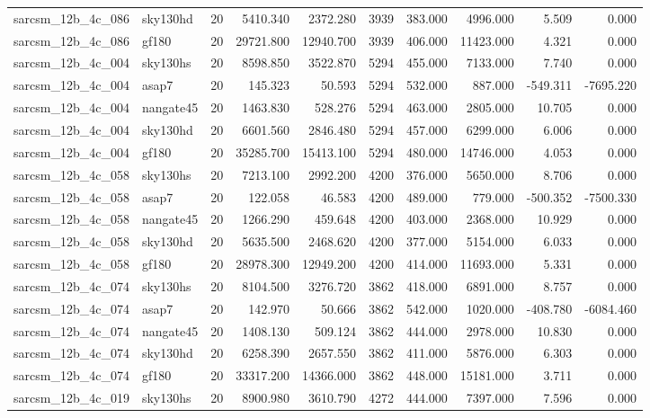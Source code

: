 \begin{longtable}{llrrrrrrrr}
sarcsm\_12b\_4c\_086 & sky130hd & 20 & 5410.340 & 2372.280 & 3939 & 383.000 & 4996.000 & 5.509 & 0.000 \\
sarcsm\_12b\_4c\_086 & gf180 & 20 & 29721.800 & 12940.700 & 3939 & 406.000 & 11423.000 & 4.321 & 0.000 \\
sarcsm\_12b\_4c\_004 & sky130hs & 20 & 8598.850 & 3522.870 & 5294 & 455.000 & 7133.000 & 7.740 & 0.000 \\
sarcsm\_12b\_4c\_004 & asap7 & 20 & 145.323 & 50.593 & 5294 & 532.000 & 887.000 & -549.311 & -7695.220 \\
sarcsm\_12b\_4c\_004 & nangate45 & 20 & 1463.830 & 528.276 & 5294 & 463.000 & 2805.000 & 10.705 & 0.000 \\
sarcsm\_12b\_4c\_004 & sky130hd & 20 & 6601.560 & 2846.480 & 5294 & 457.000 & 6299.000 & 6.006 & 0.000 \\
sarcsm\_12b\_4c\_004 & gf180 & 20 & 35285.700 & 15413.100 & 5294 & 480.000 & 14746.000 & 4.053 & 0.000 \\
sarcsm\_12b\_4c\_058 & sky130hs & 20 & 7213.100 & 2992.200 & 4200 & 376.000 & 5650.000 & 8.706 & 0.000 \\
sarcsm\_12b\_4c\_058 & asap7 & 20 & 122.058 & 46.583 & 4200 & 489.000 & 779.000 & -500.352 & -7500.330 \\
sarcsm\_12b\_4c\_058 & nangate45 & 20 & 1266.290 & 459.648 & 4200 & 403.000 & 2368.000 & 10.929 & 0.000 \\
sarcsm\_12b\_4c\_058 & sky130hd & 20 & 5635.500 & 2468.620 & 4200 & 377.000 & 5154.000 & 6.033 & 0.000 \\
sarcsm\_12b\_4c\_058 & gf180 & 20 & 28978.300 & 12949.200 & 4200 & 414.000 & 11693.000 & 5.331 & 0.000 \\
sarcsm\_12b\_4c\_074 & sky130hs & 20 & 8104.500 & 3276.720 & 3862 & 418.000 & 6891.000 & 8.757 & 0.000 \\
sarcsm\_12b\_4c\_074 & asap7 & 20 & 142.970 & 50.666 & 3862 & 542.000 & 1020.000 & -408.780 & -6084.460 \\
sarcsm\_12b\_4c\_074 & nangate45 & 20 & 1408.130 & 509.124 & 3862 & 444.000 & 2978.000 & 10.830 & 0.000 \\
sarcsm\_12b\_4c\_074 & sky130hd & 20 & 6258.390 & 2657.550 & 3862 & 411.000 & 5876.000 & 6.303 & 0.000 \\
sarcsm\_12b\_4c\_074 & gf180 & 20 & 33317.200 & 14366.000 & 3862 & 448.000 & 15181.000 & 3.711 & 0.000 \\
sarcsm\_12b\_4c\_019 & sky130hs & 20 & 8900.980 & 3610.790 & 4272 & 444.000 & 7397.000 & 7.596 & 0.000 \\

\end{longtable}
